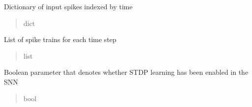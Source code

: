 \documentclass[letterpaper,10pt,english]{sphinxmanual}
\begin{document}
\begin{fulllineitems}
\begin{fulllineitems}
\begin{quote}
\begin{description}
\end{description}\end{quote}

\end{fulllineitems}


\begin{fulllineitems}
\label{\detokenize{index:superneuromat.SNN.input_spikes}}
\pysigstartsignatures
\pysigline
{}
\pysigstopsignatures
\sphinxAtStartPar
Dictionary of input spikes indexed by time
\begin{quote}\begin{description}
\sphinxAtStartPar
dict

\end{description}\end{quote}

\end{fulllineitems}


\begin{fulllineitems}
\label{\detokenize{index:superneuromat.SNN.spike_train}}
\pysigstartsignatures
\pysigline
{}
\pysigstopsignatures
\sphinxAtStartPar
List of spike trains for each time step
\begin{quote}\begin{description}
\sphinxAtStartPar
list

\end{description}\end{quote}

\end{fulllineitems}


\begin{fulllineitems}
\label{\detokenize{index:superneuromat.SNN.stdp}}
\pysigstartsignatures
\pysigline
{}
\pysigstopsignatures
\sphinxAtStartPar
Boolean parameter that denotes whether STDP learning has been enabled in the SNN
\begin{quote}\begin{description}
\sphinxAtStartPar
bool


\end{description}
\end{quote}
\end{fulllineitems}
\end{fulllineitems}
\end{document}
